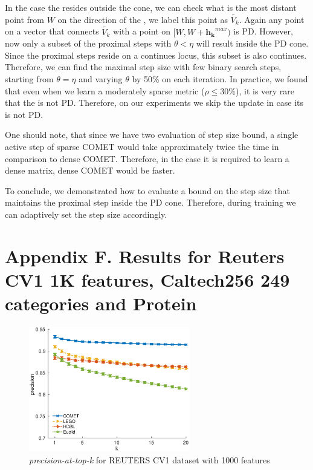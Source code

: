 \documentclass[twoside,11pt]{article}
\newcommand\mat[1]{{#1}}
\renewcommand\vec[1]{\mathbf{#1}}
\newcommand{\W}{\mat{W}}
\newcommand{\hk}{\vec{h_k}}
\newcommand{\Vk}{\mat{V_k}}
\begin{document}
In the case the \Vkorigin resides outside the cone, we can check what is the most distant point from $\W$ on the direction of the \Vkorigin, we label this point as $\widetilde{\Vk}$. Again any point on a vector that connects $\widetilde{\Vk}$ with a point on $[\W, \W + \hk^{max})$ is PD. However, now only a subset of the proximal steps with $\theta < \eta$ will result inside the PD cone. Since the proximal steps reside on a continues locus, this subset is also continues. Therefore, we can find the maximal step size with few binary search steps, starting from $\theta = \eta$ and varying $\theta$ by 50\% on each iteration. In practice, we found that even when we learn a moderately sparse metric ($\rho \leq 30\%$), it is very rare that the \Vkorigin is not PD. Therefore, on our experiments we skip the update in case its \Vkorigin is not PD.

One should note, that since we have two evaluation of step size bound, a single active step of sparse COMET would take approximately twice the time in comparison to dense COMET. Therefore, in the case it is required to learn a dense matrix, dense COMET would be faster.

To conclude, we demonstrated how to evaluate a bound on the step size that maintains the proximal step inside the PD cone. Therefore, during training we can adaptively set the step size accordingly.

\section*{Appendix F. Results for Reuters CV1 1K features, Caltech256 249 categories and Protein}

\begin{figure}[h]
\centering
\includegraphics[width=7cm]{precision@k_rcv1_4_ig1000}
\captionsetup{font=small}
\caption*{\textit{precision-at-top-k} for REUTERS CV1 dataset with 1000 features}

\end{figure}
\end{document}
